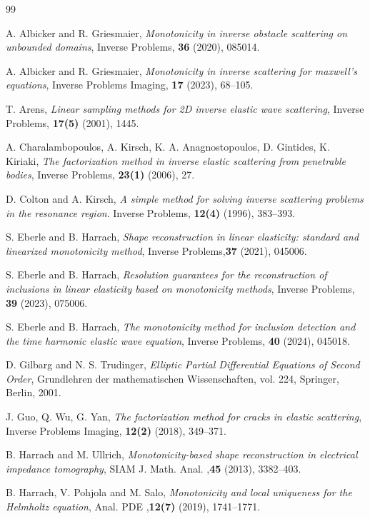 \documentclass[11pt,reqno,twoside]{amsart}
\theoremstyle{definition}
\theoremstyle{remark}
\numberwithin{equation}{section}
\begin{document}
\begin{thebibliography}{99}


A. Albicker and R. Griesmaier, {\it Monotonicity in inverse obstacle scattering on unbounded domains}, Inverse Problems, \textbf{36} (2020), 085014.

A. Albicker and R. Griesmaier, {\it Monotonicity in inverse scattering for maxwell’s equations}, Inverse Problems Imaging, \textbf{17} (2023), 68–105.

T. Arens, {\it Linear sampling methods for 2D inverse elastic wave scattering}, Inverse Problems, \textbf{17(5)} (2001), 1445.

A. Charalambopoulos, A. Kirsch, K. A. Anagnostopoulos, D. Gintides, K. Kiriaki, {\it The factorization method in inverse elastic scattering from penetrable bodies}, Inverse Problems, \textbf{23(1)} (2006), 27.

D. Colton and A. Kirsch, {\it A simple method for solving inverse scattering problems in the resonance region}. Inverse Problems, \textbf{12(4)} (1996), 383–393.

S. Eberle and B. Harrach, {\it Shape reconstruction in linear elasticity: standard and linearized monotonicity method}, Inverse Problems,\textbf{37} (2021), 045006.

S. Eberle and B. Harrach, {\it Resolution guarantees for the reconstruction of inclusions in linear elasticity based on monotonicity methods}, Inverse Problems, \textbf{39} (2023), 075006.

S. Eberle and B. Harrach, {\it The monotonicity method for inclusion detection and the time harmonic elastic wave equation}, Inverse Problems, \textbf{40} (2024), 045018.

D. Gilbarg and N. S. Trudinger, {\it Elliptic Partial Differential Equations of Second Order}, Grundlehren der mathematischen Wissenschaften, vol. 224, Springer, Berlin, 2001.

J. Guo, Q. Wu, G. Yan, {\it The factorization method for cracks in elastic scattering}, Inverse Problems Imaging, \textbf{12(2)} (2018), 349–371.

B. Harrach and M. Ullrich, {\it Monotonicity-based shape reconstruction in electrical impedance tomography}, SIAM J. Math. Anal. ,\textbf{45} (2013), 3382–403.

B. Harrach, V. Pohjola and M. Salo, {\it Monotonicity and local uniqueness for the Helmholtz equation}, Anal. PDE ,\textbf{12(7)} (2019), 1741–1771.


\end{thebibliography}
\end{document}
